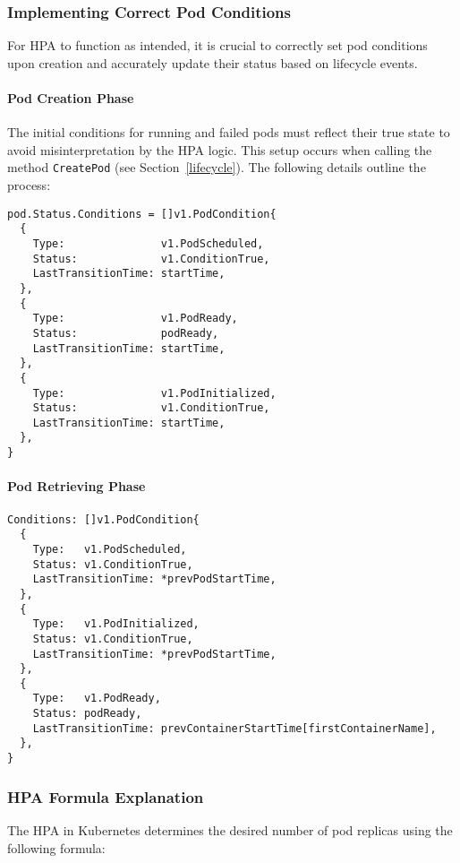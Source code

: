 \subsubsection{Implementing Correct Pod Conditions}

For HPA to function as intended, it is crucial to correctly set pod conditions upon creation and accurately update their status based on lifecycle events.

\paragraph{Pod Creation Phase}

The initial conditions for running and failed pods must reflect their true state to avoid misinterpretation by the HPA logic. This setup occurs when calling the method \texttt{CreatePod} (see Section~\ref{lifecycle}). The following details outline the process:

\begin{verbatim}
pod.Status.Conditions = []v1.PodCondition{
  {
    Type:               v1.PodScheduled,
    Status:             v1.ConditionTrue,
    LastTransitionTime: startTime,
  },
  {
    Type:               v1.PodReady,
    Status:             podReady,
    LastTransitionTime: startTime,
  },
  {
    Type:               v1.PodInitialized,
    Status:             v1.ConditionTrue,
    LastTransitionTime: startTime,
  },
}
\end{verbatim}

\paragraph{Pod Retrieving Phase}

\begin{verbatim}
Conditions: []v1.PodCondition{
  {
    Type:   v1.PodScheduled,
    Status: v1.ConditionTrue,
    LastTransitionTime: *prevPodStartTime,
  },
  {
    Type:   v1.PodInitialized,
    Status: v1.ConditionTrue,
    LastTransitionTime: *prevPodStartTime,
  },
  {
    Type:   v1.PodReady,
    Status: podReady,
    LastTransitionTime: prevContainerStartTime[firstContainerName],
  },
}
\end{verbatim}

\subsubsection{HPA Formula Explanation}

The HPA in Kubernetes determines the desired number of pod replicas using the following formula:

